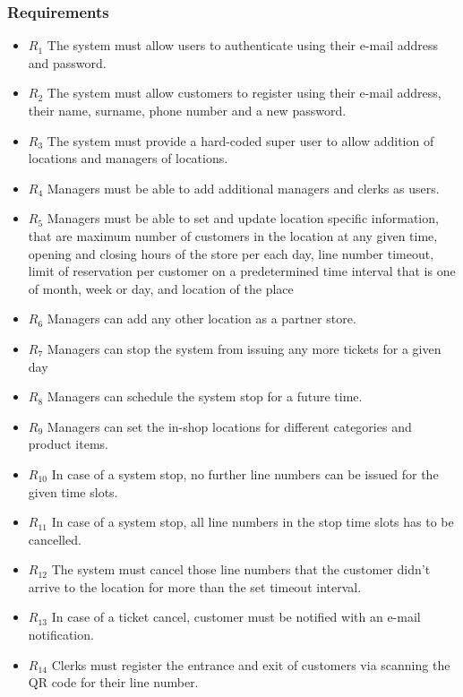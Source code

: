 \subsubsection{Requirements}
\begin{itemize}
    \item \textbf{$R_1$} The system must allow users to authenticate using their e-mail address and password.
    \item \textbf{$R_2$} The system must allow customers to register using their e-mail address, their name, surname, phone number and a new password.
    \item \textbf{$R_3$} The system must provide a hard-coded super user to allow addition of locations and managers of locations.
    \item \textbf{$R_4$} Managers must be able to add additional managers and clerks as users.
    \item \textbf{$R_5$} Managers must be able to set and update location specific information, that are maximum number of customers in the location at any given time, opening and closing hours of the store per each day, line number timeout, limit of reservation per customer on a predetermined time interval that is one of month, week or day, and location of the place %
    \item \textbf{$R_6$} Managers can add any other location as a partner store.
    \item \textbf{$R_7$} Managers can stop the system from issuing any more tickets for a given day
    \item \textbf{$R_8$} Managers can schedule the system stop for a future time.
    \item \textbf{$R_9$} Managers can set the in-shop locations for different categories and product items.
    \item \textbf{$R_{10}$} In case of a system stop, no further line numbers can be issued for the given time slots.
    \item \textbf{$R_{11}$} In case of a system stop, all line numbers in the stop time slots has to be cancelled.
    \item \textbf{$R_{12}$} The system must cancel those line numbers that the customer didn't arrive to the location for more than the set timeout interval.
    \item \textbf{$R_{13}$} In case of a ticket cancel, customer must be notified with an e-mail notification.
    \item \textbf{$R_{14}$} Clerks must register the entrance and exit of customers via scanning the QR code for their line number.

\end{itemize}
